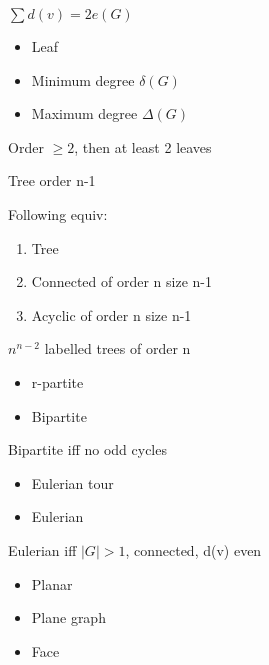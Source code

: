 \begin{lemma}
    $\sum d(v) = 2e(G)$
\end{lemma}

\begin{itemize}
    \item Leaf
    \item Minimum degree $\delta(G)$
    \item Maximum degree $\Delta(G)$
\end{itemize}

\begin{thm}
    Order $\geq 2$, then at least 2 leaves
\end{thm}

\begin{cor}
    Tree order n-1
\end{cor}

\begin{cor}
    Following equiv:
    \begin{enumerate}
        \item Tree
        \item Connected of order n size n-1
        \item Acyclic of order n size n-1
    \end{enumerate}
\end{cor}

\begin{thm} [Caley]
    $n^{n-2}$ labelled trees of order n
\end{thm}

\begin{itemize}
    \item r-partite
    \item Bipartite
\end{itemize}

\begin{thm}
    Bipartite iff no odd cycles
\end{thm}

\begin{itemize}
    \item Eulerian tour
    \item Eulerian
\end{itemize}

\begin{thm}
    Eulerian iff $|G| > 1$, connected, d(v) even
\end{thm}

\begin{itemize}
   \item Planar
   \item Plane graph
   \item Face
\end{itemize}

